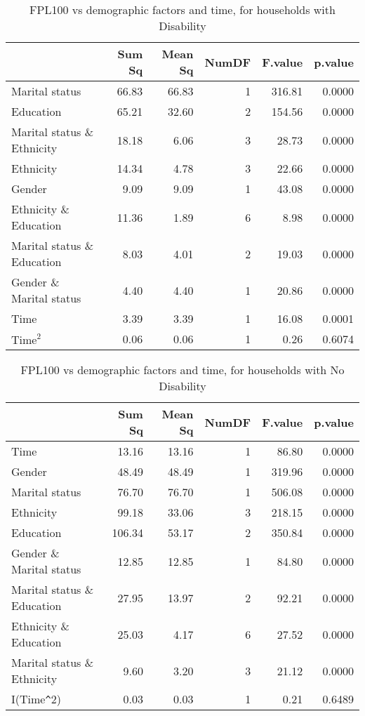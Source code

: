\begin{table}[H]
\footnotesize
\centering
\begin{tabular}{lrrrrr}
  \hline
  & Sum Sq & Mean Sq & NumDF & F.value & p.value \\ 
  \hline
  Marital status & 66.83 & 66.83 & 1 & 316.81 & 0.0000 \\ 
  Education & 65.21 & 32.60 & 2 & 154.56 & 0.0000 \\ 
  Marital status \& Ethnicity & 18.18 & 6.06 & 3 & 28.73 & 0.0000 \\ 
  Ethnicity & 14.34 & 4.78 & 3 & 22.66 & 0.0000 \\ 
  Gender & 9.09 & 9.09 & 1 & 43.08 & 0.0000 \\ 
  Ethnicity \& Education & 11.36 & 1.89 & 6 & 8.98 & 0.0000 \\ 
  Marital status \& Education & 8.03 & 4.01 & 2 & 19.03 & 0.0000 \\ 
  Gender \& Marital status & 4.40 & 4.40 & 1 & 20.86 & 0.0000 \\ 
  Time & 3.39 & 3.39 & 1 & 16.08 & 0.0001 \\ 
  $\text{Time}^2$ & 0.06 & 0.06 & 1 & 0.26 & 0.6074 \\ 
  \hline
\end{tabular}
\caption{FPL100 vs demographic factors and time, for households with Disability} 
\label{tab:Anova2}
\end{table}


\begin{table}[H]
\footnotesize
\centering
\begin{tabular}{lrrrrr}
  \hline
  & Sum Sq & Mean Sq & NumDF & F.value & p.value \\ 
  \hline
  Time & 13.16 & 13.16 & 1 & 86.80 & 0.0000 \\ 
  Gender & 48.49 & 48.49 & 1 & 319.96 & 0.0000 \\ 
  Marital status & 76.70 & 76.70 & 1 & 506.08 & 0.0000 \\ 
  Ethnicity & 99.18 & 33.06 & 3 & 218.15 & 0.0000 \\ 
  Education & 106.34 & 53.17 & 2 & 350.84 & 0.0000 \\ 
  Gender \& Marital status & 12.85 & 12.85 & 1 & 84.80 & 0.0000 \\ 
  Marital status \& Education & 27.95 & 13.97 & 2 & 92.21 & 0.0000 \\ 
  Ethnicity \& Education & 25.03 & 4.17 & 6 & 27.52 & 0.0000 \\ 
  Marital status \& Ethnicity & 9.60 & 3.20 & 3 & 21.12 & 0.0000 \\ 
  I(Time\verb|^|2) & 0.03 & 0.03 & 1 & 0.21 & 0.6489 \\ 
   \hline
\end{tabular}
\caption{FPL100 vs demographic factors and time, for households with No Disability} 
\label{tab:Anova3}
\end{table}

